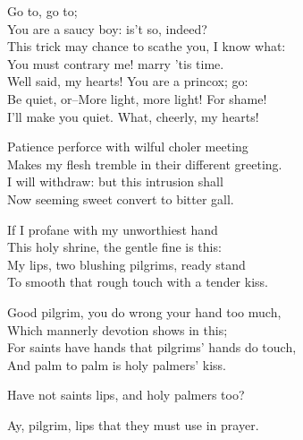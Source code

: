 \begin{speech}
Go to, go to; \\
You are a saucy boy: is't so, indeed? \\
This trick may chance to scathe you, I know what: \\
You must contrary me! marry 'tis time. \\
Well said, my hearts!   You are a princox; go: \\
Be quiet, or--More light, more light!   For shame! \\
I'll make you quiet. What, cheerly, my hearts! \\
\end{speech}
\begin{speech}
Patience perforce with wilful choler meeting \\
Makes my flesh tremble in their different greeting. \\
I will withdraw: but this intrusion shall \\
Now seeming sweet convert to bitter gall.  \\
\end{speech}
\begin{speech}
 If I profane with my unworthiest hand
\\
This holy shrine, the gentle fine is this: \\
My lips, two blushing pilgrims, ready stand \\
To smooth that rough touch with a tender kiss. \\
\end{speech}
\begin{speech}
Good pilgrim, you do wrong your hand too much, \\

Which mannerly devotion shows in this; \\
For saints have hands that pilgrims' hands do touch, \\
And palm to palm is holy palmers' kiss. \\
\end{speech}
\begin{speech}
Have not saints lips, and holy palmers too? \\
\end{speech}
\begin{speech}
Ay, pilgrim, lips that they must use in prayer. \\

\end{speech}

